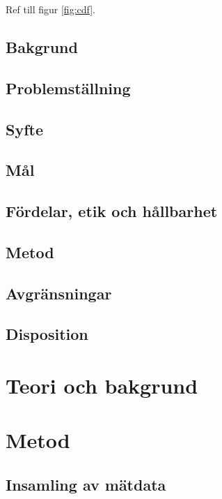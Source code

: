 Ref till figur \ref{fig:cdf}.


\subsection{Bakgrund}

\subsection{Problemställning}

\subsection{Syfte}

\subsection{Mål}

\subsection{Fördelar, etik och hållbarhet}

\subsection{Metod}

\subsection{Avgränsningar}

\subsection{Disposition}

\clearpage
\section{Teori och bakgrund}

\clearpage
\section{Metod}

\subsection{Insamling av mätdata}
